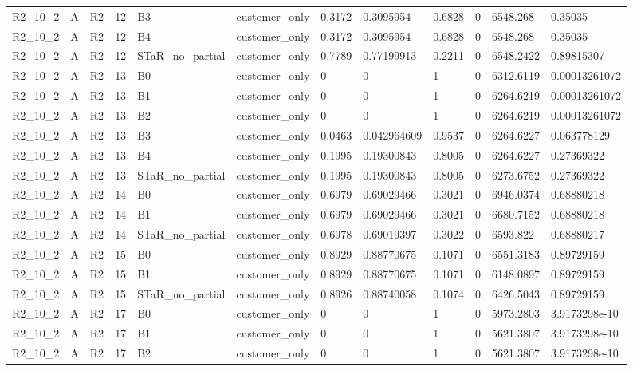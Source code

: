 \begin{longtable}{llllllllllll}
R2\_10\_2 & A & R2 & 12 & B3 & customer\_only & 0.3172 & 0.3095954 & 0.6828 & 0 & 6548.268 & 0.35035 \\
R2\_10\_2 & A & R2 & 12 & B4 & customer\_only & 0.3172 & 0.3095954 & 0.6828 & 0 & 6548.268 & 0.35035 \\
R2\_10\_2 & A & R2 & 12 & STaR\_no\_partial & customer\_only & 0.7789 & 0.77199913 & 0.2211 & 0 & 6548.2422 & 0.89815307 \\
R2\_10\_2 & A & R2 & 13 & B0 & customer\_only & 0 & 0 & 1 & 0 & 6312.6119 & 0.00013261072 \\
R2\_10\_2 & A & R2 & 13 & B1 & customer\_only & 0 & 0 & 1 & 0 & 6264.6219 & 0.00013261072 \\
R2\_10\_2 & A & R2 & 13 & B2 & customer\_only & 0 & 0 & 1 & 0 & 6264.6219 & 0.00013261072 \\
R2\_10\_2 & A & R2 & 13 & B3 & customer\_only & 0.0463 & 0.042964609 & 0.9537 & 0 & 6264.6227 & 0.063778129 \\
R2\_10\_2 & A & R2 & 13 & B4 & customer\_only & 0.1995 & 0.19300843 & 0.8005 & 0 & 6264.6227 & 0.27369322 \\
R2\_10\_2 & A & R2 & 13 & STaR\_no\_partial & customer\_only & 0.1995 & 0.19300843 & 0.8005 & 0 & 6273.6752 & 0.27369322 \\
R2\_10\_2 & A & R2 & 14 & B0 & customer\_only & 0.6979 & 0.69029466 & 0.3021 & 0 & 6946.0374 & 0.68880218 \\
R2\_10\_2 & A & R2 & 14 & B1 & customer\_only & 0.6979 & 0.69029466 & 0.3021 & 0 & 6680.7152 & 0.68880218 \\
R2\_10\_2 & A & R2 & 14 & STaR\_no\_partial & customer\_only & 0.6978 & 0.69019397 & 0.3022 & 0 & 6593.822 & 0.68880217 \\
R2\_10\_2 & A & R2 & 15 & B0 & customer\_only & 0.8929 & 0.88770675 & 0.1071 & 0 & 6551.3183 & 0.89729159 \\
R2\_10\_2 & A & R2 & 15 & B1 & customer\_only & 0.8929 & 0.88770675 & 0.1071 & 0 & 6148.0897 & 0.89729159 \\
R2\_10\_2 & A & R2 & 15 & STaR\_no\_partial & customer\_only & 0.8926 & 0.88740058 & 0.1074 & 0 & 6426.5043 & 0.89729159 \\
R2\_10\_2 & A & R2 & 17 & B0 & customer\_only & 0 & 0 & 1 & 0 & 5973.2803 & 3.9173298e-10 \\
R2\_10\_2 & A & R2 & 17 & B1 & customer\_only & 0 & 0 & 1 & 0 & 5621.3807 & 3.9173298e-10 \\
R2\_10\_2 & A & R2 & 17 & B2 & customer\_only & 0 & 0 & 1 & 0 & 5621.3807 & 3.9173298e-10 \\

\end{longtable}
